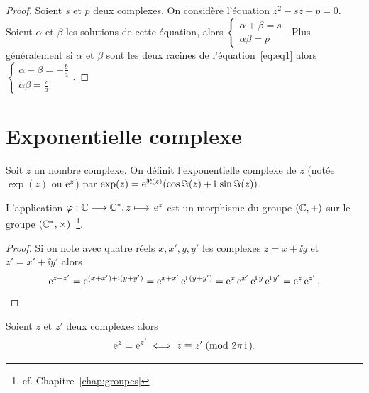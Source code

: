 \begin{proof}
  Soient \(s\) et \(p\) deux complexes. On considère l'équation \(z^2-sz + p =
  0\). Soient \(\alpha\) et \(\beta\) les solutions de cette équation, alors
  \(\begin{cases} \alpha  + \beta = s \\ \alpha \beta = p \end{cases}\).
    Plus généralement si \(\alpha\) et \(\beta\) sont les deux racines de
    l'équation~\eqref{eq:eq1} alors \(\begin{cases} \alpha + \beta =
    -\frac{b}{a} \\ \alpha \beta = \frac{c}{a} \end{cases}\).
\end{proof}

\section{Exponentielle complexe}\label{sec:expcomplexe}

\begin{defdef}
  Soit \(z\) un nombre complexe. On définit l'exponentielle complexe de \(z\)
  (notée \(\exp(z)\) ou \(\operatorname{e}^z\)) par \(\exp(z) = \operatorname{e}^{\Re(z)}(\cos \Im(z) +
  \operatorname{i}{}\sin \Im(z))\).
\end{defdef}

\begin{prop}
  L'application \(\varphi:\mathbb{C} \longrightarrow{} \mathbb{C}^*, z \longmapsto{} \operatorname{e}^z\) est un morphisme du
  groupe \((\mathbb{C}, + )\) sur le groupe \((\mathbb{C}^*,\times)\)~\footnote{cf.
  Chapitre~\ref{chap:groupes}}.
\end{prop}

\begin{proof}
  Si on note avec quatre réels \(x,x',y,y'\) les complexes \(z = x + \ii{}y\) et
  \(z' = x' + \ii{}y'\) alors
  \begin{equation*}
    \operatorname{e}^{z + z'}  =  \operatorname{e}^{(x + x') + \operatorname{i}(y + y')} = \operatorname{e}^{x + x'} \operatorname{e}^{\operatorname{i}{}(y +
    y')} = \operatorname{e}^{x} \operatorname{e}^{x'} \operatorname{e}^{\operatorname{i}{}y} \operatorname{e}^{\operatorname{i}{}y'} = \operatorname{e}^z \operatorname{e}^{z'}.
  \end{equation*}
\end{proof}

\begin{prop}
  Soient \(z\) et \(z'\) deux complexes alors
  \begin{equation}
    \operatorname{e}^z = \operatorname{e}^{z'}\iff z \equiv z'\!\pmod {2\pi{}\operatorname{i}{}}.
  \end{equation}
\end{prop}

